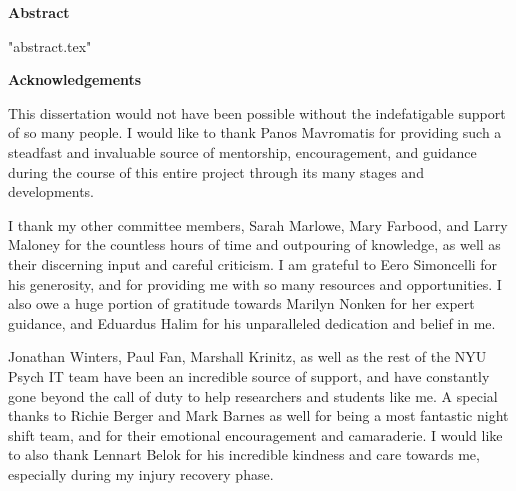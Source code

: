 \documentclass[11pt,letterpaper]{report}
\begin{document}


\clearpage
\iftoggle{pretty}
{\singlespacing}
{\doublespacing}
\thispagestyle{empty}
\begin{center}
    \vspace*{0.75in}
    \textbf{Abstract}
\end{center}
 {"abstract.tex"}
\clearpage


\clearpage
\thispagestyle{empty}
{}
\begin{center}
\vspace*{0.75in}
\textbf{Acknowledgements}
\end{center}

This dissertation would not have been possible without the indefatigable support of so many people. I would like to thank Panos Mavromatis for providing such a steadfast and invaluable source of mentorship, encouragement, and guidance during the course of this entire project through its many stages and developments.

I thank my other committee members, Sarah Marlowe, Mary Farbood, and Larry Maloney for the countless hours of time and outpouring of knowledge, as well as their discerning input and careful criticism. I am grateful to Eero Simoncelli for his generosity, and for providing me with so many resources and opportunities. I also owe a huge portion of gratitude towards Marilyn Nonken for her expert guidance, and Eduardus Halim for his unparalleled dedication and belief in me.

Jonathan Winters, Paul Fan, Marshall Krinitz, as well as the rest of the NYU Psych IT team have been an incredible source of support, and have constantly gone beyond the call of duty to help researchers and students like me. A special thanks to Richie Berger and Mark Barnes as well for being a most fantastic night shift team, and for their emotional encouragement and camaraderie. I would like to also thank Lennart Belok for his incredible kindness and care towards me, especially during my injury recovery phase.
\end{document}
